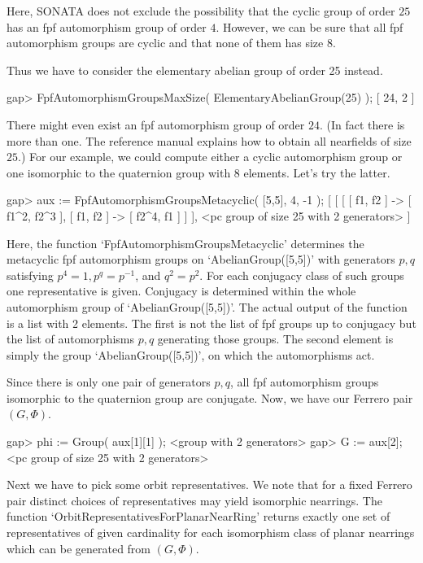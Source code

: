 Here, SONATA does not exclude the possibility that the cyclic group of
order $25$ has an fpf automorphism group of order $4$. 
However, we can be sure that all fpf automorphism groups are cyclic and that
none of them has size $8$.

Thus we have to consider the elementary abelian group of order 25 instead.

\beginexample
    gap> FpfAutomorphismGroupsMaxSize( ElementaryAbelianGroup(25) );
    [ 24, 2 ]
\endexample

There might even exist an fpf automorphism group of order $24$. (In fact
there is more than one. The reference manual explains how to obtain all
nearfields of size $25$.) 
For our example, we could compute either a cyclic automorphism group or one 
isomorphic to the quaternion group with 8 elements. Let's try the latter.
 
\beginexample
    gap> aux := FpfAutomorphismGroupsMetacyclic( [5,5], 4, -1 );
    [ [ [ [ f1, f2 ] -> [ f1^2, f2^3 ], [ f1, f2 ] -> [ f2^4, f1 ] ] ], 
      <pc group of size 25 with 2 generators> ]
\endexample

Here, the function `FpfAutomorphismGroupsMetacyclic' determines the metacyclic
fpf automorphism groups on `AbelianGroup([5,5])' with generators $p,q$
satisfying $p^4 = 1, p^q = p^{-1}$, and $q^2 = p^2$. For each conjugacy class
of such groups one representative is given. Conjugacy is determined within the
whole automorphism group of `AbelianGroup([5,5])'. 
The actual output of the function is a list with 2 elements.
The first is not the list of fpf groups up to conjugacy but the list of
automorphisms $p,q$ generating those groups.
The second element is simply the group `AbelianGroup([5,5])', on which the
automorphisms act.

Since there is only one pair of generators $p,q$, all fpf automorphism groups
isomorphic to the quaternion group are conjugate. Now, we have our Ferrero
pair $(G, \Phi)$.

\beginexample
    gap> phi := Group( aux[1][1] );
    <group with 2 generators>
    gap> G := aux[2];         
    <pc group of size 25 with 2 generators>
\endexample

Next we have to pick some orbit representatives. 
We note that for a fixed Ferrero pair distinct choices of representatives 
may yield isomorphic nearrings. The function
`OrbitRepresentativesForPlanarNearRing' returns exactly one set of
representatives of given cardinality for each isomorphism class of planar
nearrings which can be generated from $(G, \Phi)$.

